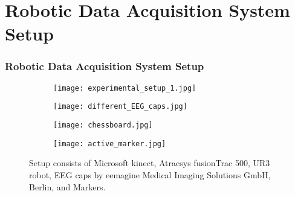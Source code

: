 \section{Robotic Data Acquisition System Setup}
\begin{frame}
	\frametitle{Robotic Data Acquisition System Setup}
	\begin{figure}[hbt!]
		\centering
		\begin{subfigure}{0.4\textwidth}
			\texttt{[image: experimental\_setup\_1.jpg]}	
		\end{subfigure}
		\begin{subfigure}{0.4\textwidth}
			\texttt{[image: different\_EEG\_caps.jpg]}	
		\end{subfigure}
		\hfill
		\begin{subfigure}{0.4\textwidth}
			\texttt{[image: chessboard.jpg]}	
		\end{subfigure}
		\begin{subfigure}{0.4\textwidth}
			\texttt{[image: active\_marker.jpg]}	
		\end{subfigure}
		
		\caption{Setup consists of Microsoft kinect, Atracsys fusionTrac 500, UR3 robot, EEG caps by eemagine Medical Imaging Solutions GmbH, Berlin, and Markers.} 
		\label{fig:Eexperimental_setup}
	\end{figure}
	
\end{frame}



 
